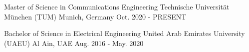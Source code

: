 


\begin{cventries}


    \cventry
    {Master of Science in Communications Engineering} %
    {Technische Universit\"at M\"unchen (TUM)} %
    {Munich, Germany} %
    {Oct. 2020 - PRESENT} %
    {}


    \cventry
    {Bachelor of Science in Electrical Engineering} %
    {United Arab Emirates University (UAEU)} %
    {Al Ain, UAE} %
    {Aug. 2016 - May. 2020} %
    {}

\end{cventries}
